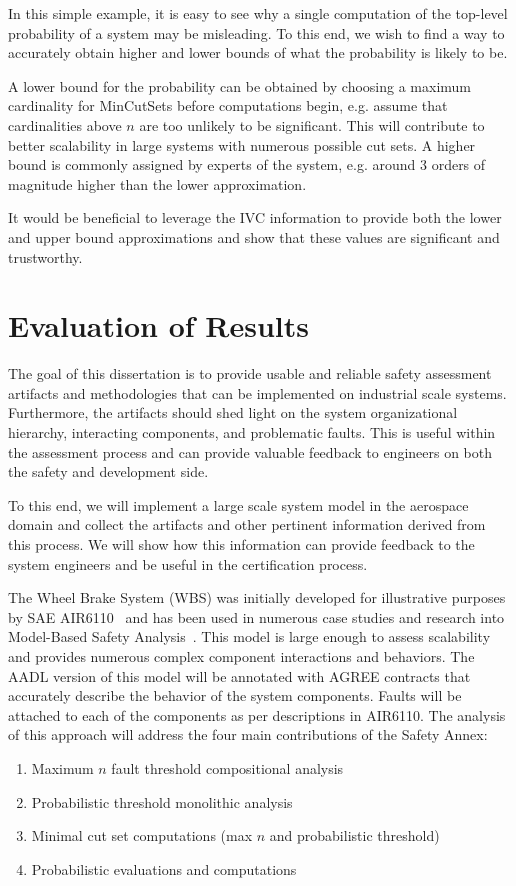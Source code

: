 In this simple example, it is easy to see why a single computation of the top-level probability of a system may be misleading. To this end, we wish to find a way to accurately obtain higher and lower bounds of what the probability is likely to be. 

A lower bound for the probability can be obtained by choosing a maximum cardinality for MinCutSets before computations begin, e.g. assume that cardinalities above $n$ are too unlikely to be significant. This will contribute to better scalability in large systems with numerous possible cut sets. A higher bound is commonly assigned by experts of the system, e.g. around 3 orders of magnitude higher than the lower approximation. 

It would be beneficial to leverage the IVC information to provide both the lower and upper bound approximations and show that these values are significant and trustworthy. 



\section{Evaluation of Results}
The goal of this dissertation is to provide usable and reliable safety assessment artifacts and methodologies that can be implemented on industrial scale systems. Furthermore, the artifacts should shed light on the system organizational hierarchy, interacting components, and problematic faults. This is useful within the assessment process and can provide valuable feedback to engineers on both the safety and development side. 

To this end, we will implement a large scale system model in the aerospace domain and collect the artifacts and other pertinent information derived from this process. We will show how this information can provide feedback to the system engineers and be useful in the certification process. 

The Wheel Brake System (WBS) was initially developed for illustrative purposes by SAE AIR6110~\cite{AIR6110} and has been used in numerous case studies and research into Model-Based Safety Analysis~\cite{Stewart17:IMBSA,DBLP:conf/cav/BozzanoCPJKPRT15,mcmillan2019increasing,cimatti2016temporal,cimatti2018tightening,konrad2016faa}. This model is large enough to assess scalability and provides numerous complex component interactions and behaviors. The AADL version of this model will be annotated with AGREE contracts that accurately describe the behavior of the system components. Faults will be attached to each of the components as per descriptions in AIR6110. The analysis of this approach will address the four main contributions of the Safety Annex: 
\begin{enumerate}
    \item Maximum $n$ fault threshold compositional analysis
    \item Probabilistic threshold monolithic analysis 
    \item Minimal cut set computations (max $n$ and probabilistic threshold)
    \item Probabilistic evaluations and computations
\end{enumerate}

